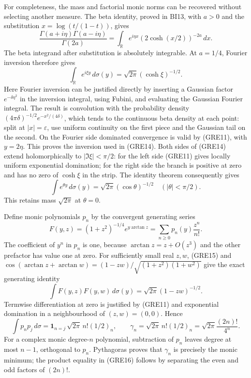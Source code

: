 \documentclass[11pt,a4paper]{article}
\begin{document}
For completeness, the mass and factorial monic norms can be recovered
without selecting another measure. The beta identity, proved in
BI13, with $a>0$ and the substitution $x=\log(t/(1-t))$, gives
\[
 \frac{\Gamma(a+i\eta)\Gamma(a-i\eta)}{\Gamma(2a)}
 =\int_{\mathbb R}e^{i\eta x}
        (2\cosh(x/2))^{-2a}\,dx.
 \tag{GRE13}
\]
The beta integrand after substitution is absolutely integrable.
At $a=1/4$, Fourier inversion therefore gives
\[
 \int_{\mathbb R}e^{i\xi y}\,d\sigma(y)
 =\sqrt{2\pi}(\cosh\xi)^{-1/2}.
 \tag{GRE14}
\]
Here Fourier inversion can be justified directly by inserting a
Gaussian factor $e^{-\delta\eta^2}$ in the inversion integral,
using Fubini, and evaluating the Gaussian Fourier integral. The result
is convolution with the probability density
$(4\pi\delta)^{-1/2}e^{-x^2/(4\delta)}$, which tends to the continuous
beta density at each point: split at $|x|=\varepsilon$, use uniform
continuity on the first piece and the Gaussian tail on the second.
On the Fourier side dominated convergence is valid by (GRE11), with
$y=2\eta$. This proves the inversion used in (GRE14).
Both sides of (GRE14) extend holomorphically to $|\Im\xi|<\pi/2$:
for the left side (GRE11) gives locally uniform exponential domination;
for the right side the branch is positive at zero and has no zero
of $\cosh\xi$ in the strip. The identity theorem consequently gives
\[
 \int e^{\theta y}\,d\sigma(y)
 =\sqrt{2\pi}(\cos\theta)^{-1/2}\quad(|\theta|<\pi/2).
 \tag{GRE15}
\]
This retains mass $\sqrt{2\pi}$ at $\theta=0$.

Define monic polynomials $p_n$ by the convergent generating series
\[
 F(y,z)=(1+z^2)^{-1/4}e^{y\arctan z}
       =\sum_{n\ge0}p_n(y)\frac{z^n}{n!}.
\]
The coefficient of $y^n$ in $p_n$ is one, because
$\arctan z=z+O(z^3)$ and the other prefactor has value one at zero.
For sufficiently small real $z,w$, (GRE15) and
$\cos(\arctan z+\arctan w)=(1-zw)/\sqrt{(1+z^2)(1+w^2)}$
give the exact generating identity
\[
 \int F(y,z)F(y,w)\,d\sigma(y)
 =\sqrt{2\pi}(1-zw)^{-1/2}.
\]
Termwise differentiation at zero is justified by (GRE11) and
exponential domination in a neighbourhood of $(z,w)=(0,0)$. Hence
\[
 \int p_n p_j\,d\sigma=\mathbf1_{n=j}\,
 \sqrt{2\pi}\,n!(1/2)_n,
 \qquad
 \gamma_n=\sqrt{2\pi}\,n!(1/2)_n
          =\sqrt{2\pi}\frac{(2n)!}{4^n}.
 \tag{GRE16}
\]
For a complex monic degree-$n$ polynomial, subtraction of $p_n$
leaves degree at most $n-1$, orthogonal to $p_n$. Pythagoras proves
that $\gamma_n$ is precisely the monic minimum; the product equality
in (GRE16) follows by separating the even and odd factors of $(2n)!$.
\end{document}
